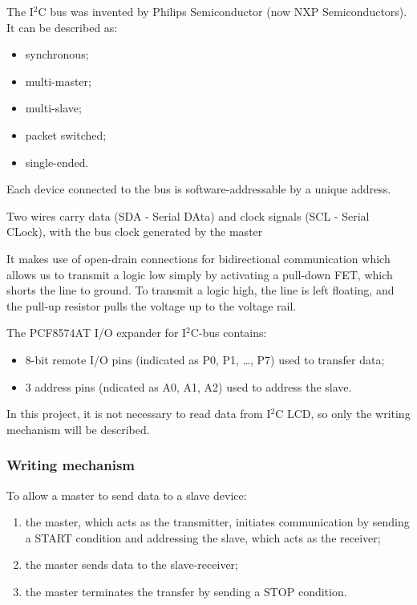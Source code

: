 \documentclass[a4paper, 12pt]{article}
\begin{document}
The I$^2$C bus was invented by Philips Semiconductor (now NXP Semiconductors). It can be described as:
\begin{itemize}
    \item synchronous;
    \item multi-master;
    \item multi-slave;
    \item packet switched;
    \item single-ended.
\end{itemize}

Each device connected to the bus is software-addressable by a unique address.

Two wires carry data (SDA - Serial DAta) and clock signals (SCL - Serial CLock), with the bus clock generated by the master

It makes use of open-drain connections for bidirectional communication which allows us to transmit a logic low simply by activating a pull-down FET, which shorts the line to ground.
To transmit a logic high, the line is left floating, and the pull-up resistor pulls the voltage up to the voltage rail.

The PCF8574AT I/O expander for I$^2$C-bus contains:
\begin{itemize}
    \item 8-bit remote I/O pins (indicated as P0, P1, \dots, P7) used to transfer data;
    \item 3 address pins (ndicated as A0, A1, A2) used to address the slave.
\end{itemize}

In this project, it is not necessary to read data from I$^2$C LCD, so only the writing mechanism will be described.

\subsubsection{Writing mechanism}

To allow a master to send data to a slave device:
\begin{enumerate}
    \item the master, which acts as the transmitter, initiates communication by sending a START condition and addressing the slave, which acts as the receiver;
    \item the master sends data to the slave-receiver;
    \item the master terminates the transfer by sending a STOP condition.
\end{enumerate}
\end{document}

